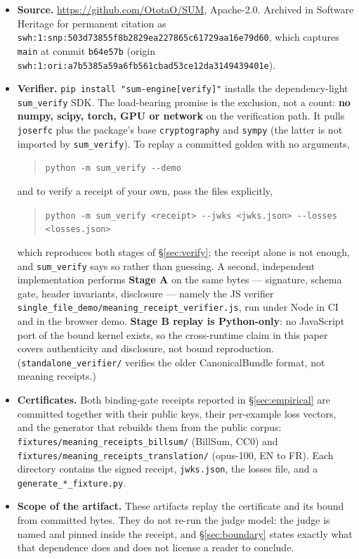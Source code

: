 \documentclass[11pt]{article}
\theoremstyle{definition}
\begin{document}
\begin{itemize}
\sloppy
\item \textbf{Source.} \url{https://github.com/OtotaO/SUM}, Apache-2.0.
  Archived in Software Heritage for permanent citation as
  \texttt{swh:1:snp:\allowbreak 503d73855f8b2829ea227865c61729aa16e79d60},
  which captures \texttt{main} at commit \texttt{b64e57b} (origin
  \texttt{swh:1:ori:\allowbreak a7b5385a59a6fb561cbad53ce12da3149439401e}).
\item \textbf{Verifier.} \texttt{pip install "sum-engine[verify]"} installs
  the dependency-light \texttt{sum\_verify} SDK. The load-bearing promise is
  the exclusion, not a count: \textbf{no numpy, scipy, torch, GPU or network}
  on the verification path. It pulls \texttt{joserfc} plus the package's base
  \texttt{cryptography} and \texttt{sympy} (the latter is not imported by
  \texttt{sum\_verify}). To replay a committed golden with no arguments,
\begin{quote}\texttt{python -m sum\_verify -{}-demo}\end{quote}
  and to verify a receipt of your own, pass the files explicitly,
\begin{quote}\texttt{python -m sum\_verify <receipt> -{}-jwks <jwks.json> -{}-losses <losses.json>}\end{quote}
  which reproduces both stages of \S\ref{sec:verify}; the receipt alone is
  not enough, and \texttt{sum\_verify} says so rather than guessing.
  A second, independent implementation performs \textbf{Stage A} on the same
  bytes --- signature, schema gate, header invariants, disclosure --- namely
  the JS verifier
  \texttt{single\_file\_demo/\allowbreak meaning\_receipt\_\allowbreak verifier.js},
  run under Node in CI and in the browser demo. \textbf{Stage B replay is
  Python-only}: no JavaScript port of the bound kernel exists, so the
  cross-runtime claim in this paper covers authenticity and disclosure, not
  bound reproduction. (\texttt{standalone\_verifier/} verifies the older
  CanonicalBundle format, not meaning receipts.)
\item \textbf{Certificates.} Both binding-gate receipts reported in
  \S\ref{sec:empirical} are committed together with their public keys, their
  per-example loss vectors, and the generator that rebuilds them from the
  public corpus: \texttt{fixtures/\allowbreak meaning\_receipts\_\allowbreak billsum/}
  (BillSum, CC0) and
  \texttt{fixtures/\allowbreak meaning\_receipts\_\allowbreak translation/}
  (opus-100, EN to FR). Each directory contains the signed receipt,
  \texttt{jwks.json}, the losses file, and a
  \texttt{generate\_*\_fixture.py}.
\item \textbf{Scope of the artifact.} These artifacts replay the certificate
  and its bound from committed bytes. They do not re-run the judge model: the
  judge is named and pinned inside the receipt, and \S\ref{sec:boundary}
  states exactly what that dependence does and does not license a reader to
  conclude.
\end{itemize}
\end{document}
